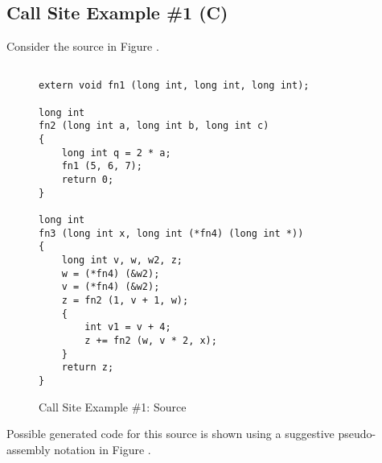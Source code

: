 \subsection{Call Site Example \#1 (C)}
Consider the  source in Figure .

\begin{figure}[h]
\begin{lstlisting}

extern void fn1 (long int, long int, long int);

long int
fn2 (long int a, long int b, long int c) 
{
    long int q = 2 * a;
    fn1 (5, 6, 7); 
    return 0;
}
 
long int
fn3 (long int x, long int (*fn4) (long int *))
{
    long int v, w, w2, z;
    w = (*fn4) (&w2);
    v = (*fn4) (&w2);
    z = fn2 (1, v + 1, w);
    {
        int v1 = v + 4;
        z += fn2 (w, v * 2, x);
    }
    return z;
}
\end{lstlisting}
\caption{Call Site Example \#1: Source}
\label{fig:callsiteexample1source}
\end{figure}

Possible generated code for this source is shown using a suggestive 
pseudo-\linebreak[0]assembly notation in Figure .

